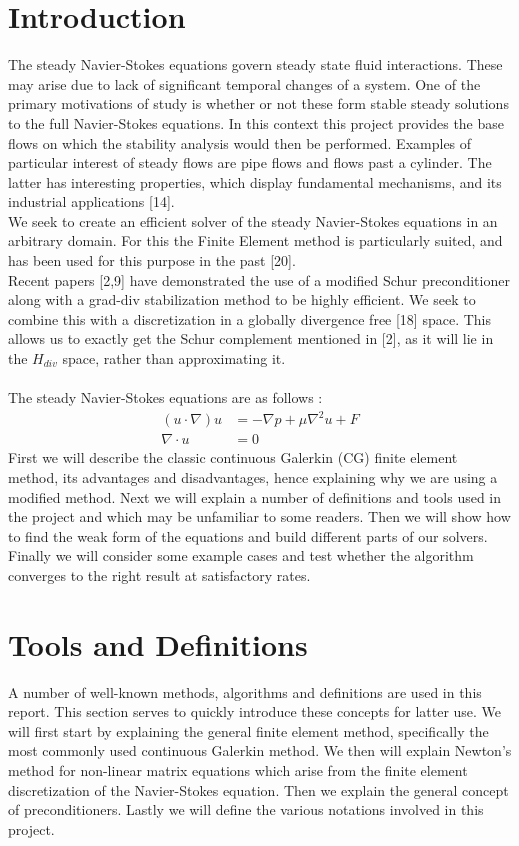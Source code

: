 \documentclass[11pt,twoside,a4paper]{article}
\begin{document}
\section{Introduction}
The steady Navier-Stokes equations govern steady state fluid interactions. These may arise due to lack of significant temporal changes of a system. One of the primary motivations of study is whether or not these form stable steady solutions to the full Navier-Stokes equations. In this context this project provides the base flows on which the stability analysis would then be performed. Examples of particular interest of steady flows are pipe flows and flows past a cylinder. The latter has interesting properties, which display fundamental mechanisms, and its industrial applications [14].\\
We seek to create an efficient solver of the steady Navier-Stokes equations in an arbitrary domain. For this the Finite Element method is particularly suited, and has been used for this purpose in the past [20]. \\
Recent papers [2,9] have demonstrated the use of a modified Schur preconditioner along with a grad-div stabilization method to be highly efficient. We seek to combine this with a discretization in a globally divergence free [18] space. This allows us to exactly get the Schur complement mentioned in [2], as it will lie in the $H_{div}$ space, rather than approximating it.\\
\\
The steady Navier-Stokes equations are as follows :
\begin{align}
(u \cdot \nabla) u &= -\nabla p + \mu \nabla^2 u + F \\
\nabla \cdot u &= 0
\end{align}
First we will describe the classic continuous Galerkin (CG) finite element method, its advantages and disadvantages, hence explaining why we are using a modified method. Next we will explain a number of definitions and tools used in the project and which may be unfamiliar to some readers. Then we will show how to find the weak form of the equations and build different parts of our solvers. Finally we will consider some example cases and test whether the algorithm converges to the right result at satisfactory rates.\\

\section{Tools and Definitions}
A number of well-known methods, algorithms and definitions are used in this report. This section serves to quickly introduce these concepts for latter use. We will first start by explaining the general finite element method, specifically the most commonly used continuous Galerkin method. We then will explain Newton's method for non-linear matrix equations which arise from the finite element discretization of the Navier-Stokes equation. Then we explain the general concept of preconditioners. Lastly we will define the various notations involved in this project.
\end{document}
